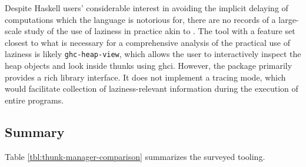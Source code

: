 \documentclass[thesis=B,english]{FITthesis}[2019/12/23]
\newcommand{\hackage}[1]{\texttt{#1}}
\begin{document}
Despite Haskell users' considerable interest in avoiding the implicit delaying
of computations which the language is notorious for, there are no records of a
large-scale study of the use of laziness in practice akin to
\cite{emp-study-laziness-r}. The tool with a feature set closest to what is
necessary for a comprehensive analysis of the practical use of laziness is
likely \hackage{ghc-heap-view}, which allows the user to interactively inspect
the heap objects and look inside thunks using \acrshort{ghci}. However, the
package primarily provides a rich library interface. It does not implement a
tracing mode, which would facilitate collection of laziness-relevant
information during the execution of entire programs.

\subsection{Summary} \label{sec:summary}
Table \ref{tbl:thunk-manager-comparison} summarizes the surveyed tooling.
\end{document}

